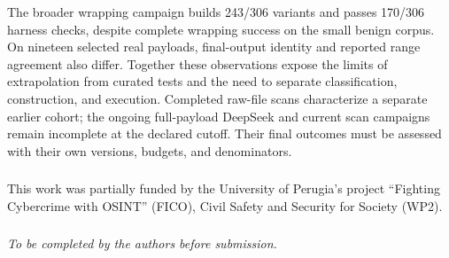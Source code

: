 \documentclass[runningheads]{llncs}
\begin{document}
The broader wrapping campaign builds 243/306 variants and passes
170/306 harness checks, despite complete wrapping success on the
small benign corpus. On nineteen selected real payloads, final-output
identity and reported range agreement also differ. Together these
observations expose the limits of extrapolation from curated tests
and the need to separate classification, construction, and execution.
Completed raw-file scans characterize a separate earlier cohort;
the ongoing full-payload DeepSeek and current scan campaigns remain
incomplete at the declared cutoff. Their final outcomes must be
assessed with their own versions, budgets, and denominators.

\begin{credits}
\subsubsection{\ackname}
This work was partially funded by the University of Perugia's project ``Fighting Cybercrime with OSINT'' (FICO), Civil Safety and Security for Society (WP2).

\subsubsection{\discintname}
\emph{To be completed by the authors before submission.}
\end{credits}



\end{document}
